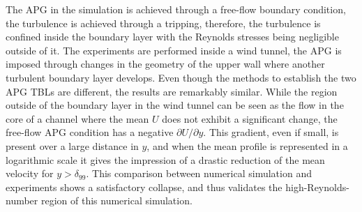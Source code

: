 The APG in the simulation is achieved through a free-flow boundary condition, the turbulence is achieved through a tripping, therefore, the turbulence is confined inside the boundary layer with the Reynolds stresses being negligible outside of it. The experiments are performed inside a wind tunnel, the APG is imposed through changes in the geometry of the upper wall where another turbulent boundary layer develops. Even though the methods to establish the two APG TBLs are different, the results are remarkably similar. 
While the region outside of the boundary layer in the wind tunnel can be seen as the flow in the core of a channel where the mean $U$ does not exhibit a significant change, the free-flow APG condition has a negative $\partial{U}/\partial{y}$. This gradient, even if small, is present over a large distance in $y$, and when the mean profile is represented in a logarithmic scale it gives the impression of a drastic reduction of the mean velocity for $y>\delta_{99}$.
This comparison between numerical simulation and experiments shows a satisfactory collapse, and thus validates the high-Reynolds-number region of this numerical simulation.
